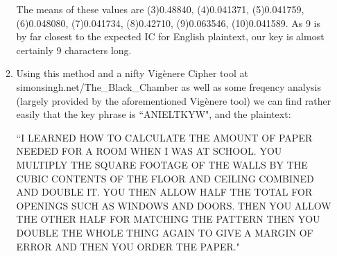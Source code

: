 \documentclass[10pt,letterpaper]{article}
\begin{document}
\begin{enumerate}
\begin{enumerate}
            The means of these values are (3)0.48840, (4)0.041371, (5)0.041759, (6)0.048080, (7)0.041734, (8)0.42710, (9)0.063546, (10)0.041589. As 9 is by far closest to the expected IC for English plaintext, our key is almost certainly 9 characters long.

        \item
            Using this method and a nifty Vig\`{e}nere Cipher tool at simonsingh.net/The\_Black\_Chamber as well as some freqency analysis (largely provided by the aforementioned Vig\`{e}nere tool) we can find rather easily that the key phrase is ``ANIELTKYW", and the plaintext:\\
            \par ``I LEARNED HOW TO CALCULATE THE AMOUNT OF PAPER NEEDED FOR A ROOM WHEN I WAS AT SCHOOL.  YOU MULTIPLY THE SQUARE FOOTAGE OF THE WALLS BY THE CUBIC CONTENTS OF THE FLOOR AND CEILING COMBINED AND DOUBLE IT.  YOU THEN ALLOW HALF THE TOTAL FOR OPENINGS SUCH AS WINDOWS AND DOORS.  THEN YOU ALLOW THE OTHER HALF FOR MATCHING THE PATTERN THEN YOU DOUBLE THE WHOLE THING AGAIN TO GIVE A MARGIN OF ERROR AND THEN YOU ORDER THE PAPER."
    \end{enumerate}

\end{enumerate}
\end{document}
